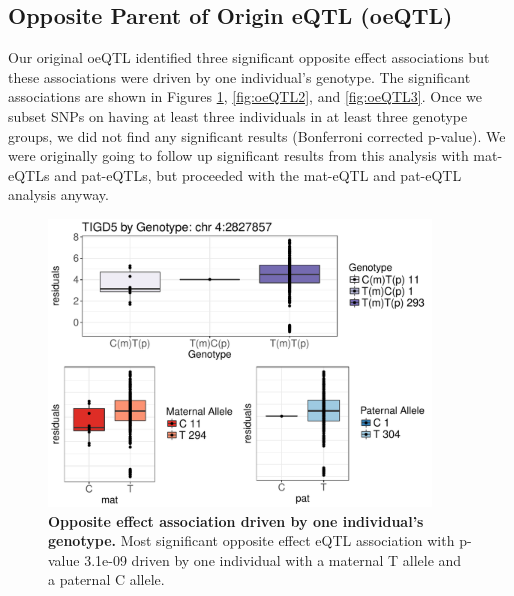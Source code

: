 \subsection{Opposite Parent of Origin eQTL (oeQTL) }\label{Opposite Parent of Origin eQTL (oeQTL)} 
Our original oeQTL identified three significant opposite effect associations but these associations were driven by one individual's genotype. The significant associations are shown in Figures \ref{fig:oeQTL}, \ref{fig:oeQTL2}, and \ref{fig:oeQTL3}. Once we subset SNPs on having at least three individuals in at least three genotype groups, we did not find any significant results (Bonferroni corrected p-value). We were originally going to follow up significant results from this analysis with mat-eQTLs and pat-eQTLs, but proceeded with the mat-eQTL and pat-eQTL analysis anyway.


\begin{figure}[!htb]
\centering \includegraphics[width=4in]{img/ch04/fig-01-oeQTL.pdf}
\caption[Opposite effect association with \emph{TIGD5} driven by one individual's genotype.]{\textbf{Opposite effect association driven by one individual's genotype.} Most significant opposite effect eQTL association with p-value 3.1e-09 driven by one individual with a maternal T allele and a paternal C allele.}
\label{fig:oeQTL}
\end{figure}

